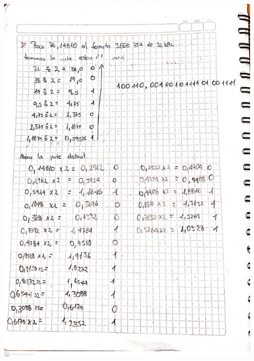 \documentclass[12pt]{article}
\begin{document}
\vspace{0.5cm}
\begin{itemize}

\begin{minipage}{0.95\textwidth}
    \raggedleft
    \includegraphics[width=1.15\textwidth]{inFiles/Figures/ejer2.jpeg}
\end{minipage}
\vspace{1.5cm}


\end{itemize}
\end{document}
